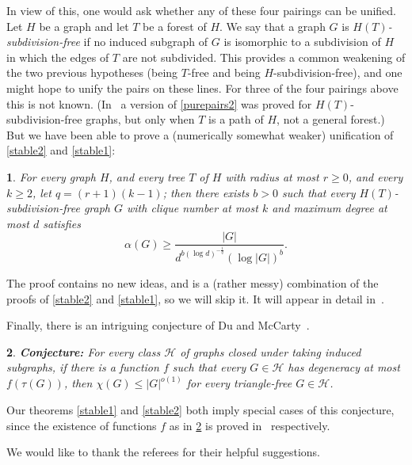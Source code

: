 \documentclass[titlepage,11pt]{article}
\newtheorem{thm}{}[section]
\begin{document}
In view of this, one would ask whether any of these four pairings can be unified. Let $H$ be a graph and let $T$ be a forest of $H$. 
We say that a graph $G$ is {\em $H(T)$-subdivision-free} if no induced subgraph of $G$ is isomorphic to a subdivision of $H$
in which the edges of $T$ are not subdivided. This provides a common weakening of the two previous
hypotheses (being $T$-free and being $H$-subdivision-free), and one might hope to unify the pairs on these lines.
For three of the four pairings above this is not known. (In~\cite{pure2} a version of \ref{purepairs2} was proved for $H(T)$-subdivision-free graphs, but only
when $T$ is a path of $H$, not a general forest.)
But we have been able to prove a (numerically somewhat weaker) unification of \ref{stable2} and \ref{stable1}:
\begin{thm}\label{stable1+2}
For every graph $H$, and every tree $T$ of $H$ with radius at most $r\ge 0$, and every $k\ge 2$, let $q=(r+1)(k-1)$; then
there exists $b>0$ such that
every $H(T)$-subdivision-free graph $G$ with clique number at most $k$ and maximum degree at most $d$ satisfies
$$\alpha(G)\ge \frac{|G|}{d^{b(\log d)^{-\frac1q}}(\log |G|)^{b}}.$$
\end{thm}
The proof contains no new ideas, and is a (rather messy) combination of the proofs of \ref{stable2} and \ref{stable1},  
so we will skip it. It will appear in detail in~\cite{tungthesis}.

Finally, there is an intriguing conjecture of Du and McCarty~\cite{mccarty}. 
\begin{thm}\label{mccartyconj}
{\bf Conjecture: }For every class $\mathcal{H}$ of graphs closed under taking induced subgraphs,
if there is a function $f$ such that every $G\in \mathcal{H}$ has degeneracy at most $f(\tau(G))$,  then
$\chi(G)\le |G|^{o(1)}$ for every triangle-free $G\in \mathcal{H}$.
\end{thm}
Our theorems \ref{stable1} and \ref{stable2} both imply special cases of this conjecture, since the existence of
functions $f$ as in \ref{mccartyconj} is proved in~\cite{poly1,kuhnosthus} respectively.

\bigskip {} We would like to thank the referees for their helpful suggestions.
\end{document}
